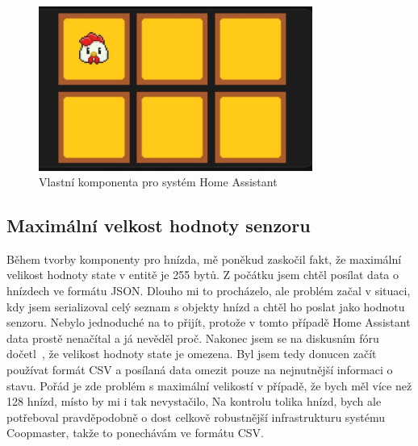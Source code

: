 \begin{figure}[H]
    \centering
    \includegraphics[width=0.8\textwidth]{img/homeassitant_custom_component}
    \caption{Vlastní komponenta pro systém Home Assistant}
    \label{fig:homeassitant_custom_component}
\end{figure}



\subsection*{Maximální velkost hodnoty senzoru}
Během tvorby komponenty pro hnízda, mě poněkud zaskočil fakt, že maximální velikost hodnoty state v entitě je 255 bytů.
Z počátku jsem chtěl posílat data o hnízdech ve formátu JSON.
Dlouho mi to procházelo, ale problém začal v situaci, kdy jsem serializoval celý seznam s objekty hnízd a chtěl ho poslat jako hodnotu senzoru.
Nebylo jednoduché na to přijít, protože v tomto případě Home Assistant data prostě nenačítal a já nevěděl proč.
Nakonec jsem se na diskusním fóru dočetl~\cite{HAStateLimit255}, že velikost hodnoty state je omezena.
Byl jsem tedy donucen začít používat formát CSV a posílaná data omezit pouze na nejnutnější informaci o stavu.
Pořád je zde problém s maximální velikostí v případě, že bych měl více než 128 hnízd, místo by mi i tak nevystačilo,
Na kontrolu tolika hnízd, bych ale potřeboval pravděpodobně o dost celkově robustnější infrastrukturu systému Coopmaster, takže to ponechávám ve formátu CSV.


